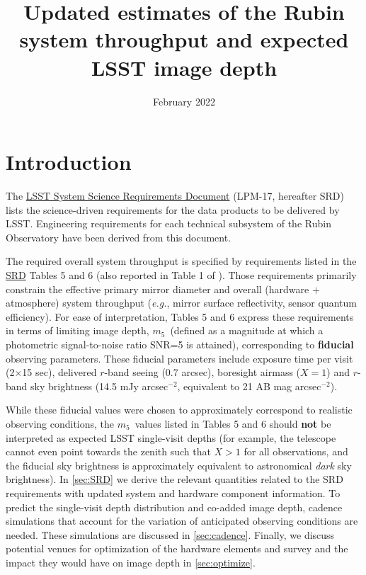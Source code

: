 \documentclass[PST,authoryear,toc]{lsstdoc}
\title{Updated estimates of the Rubin system throughput and expected LSST image depth}
\date{February 2022}
\date{\vcsDate}
\newcommand{\mf}{\ensuremath{m_5}}
\begin{document}
\maketitle


\section{Introduction}

The \href{https://docushare.lsst.org/docushare/dsweb/Get/LPM-17}{{LSST System Science Requirements Document}} (LPM-17, hereafter SRD) lists the science-driven requirements for the data products to be delivered by LSST.
Engineering requirements for each technical subsystem of the Rubin Observatory have been derived from this document.

The required overall system throughput is specified by requirements listed in the \href{https://docushare.lsst.org/docushare/dsweb/Get/LPM-17}{{SRD}} Tables 5 and 6 (also reported in Table 1 of \citealt{2019ApJ...873..111I}).
Those requirements primarily constrain the effective primary mirror diameter and overall (hardware $+$ atmosphere)
system throughput ({\it e.g.}, mirror surface reflectivity, sensor quantum efficiency). For ease of interpretation,
Tables 5 and 6 express these requirements in terms of limiting image depth, \mf\ (defined as a magnitude at which
a photometric signal-to-noise ratio SNR=5 is attained), corresponding to {\bf fiducial} observing parameters. These fiducial parameters
include exposure time per visit (2$\times$15 sec), delivered $r$-band seeing (0.7 arcsec), boresight airmass ($X=1$) and $r$-band sky brightness (14.5 mJy arcsec$^{-2}$, equivalent to
21 AB mag arcsec$^{-2}$).

While these fiducial values were chosen to approximately correspond to realistic observing conditions, the \mf\ values listed in Tables 5 and 6 should {\bf not} be interpreted as expected LSST single-visit depths (for example,
the telescope cannot even point towards the zenith such that $X>1$ for all observations, and the fiducial sky brightness is approximately equivalent to
astronomical {\it dark} sky brightness). In \autoref{sec:SRD} we derive the relevant quantities related to the SRD requirements with updated system and hardware component information. To predict the single-visit depth distribution and co-added image depth,
cadence simulations that account for the variation of anticipated observing conditions are needed. These simulations are discussed
in \autoref{sec:cadence}. Finally, we discuss potential venues for optimization of the hardware elements and survey and the impact they would have on image depth in \autoref{sec:optimize}.
\end{document}
